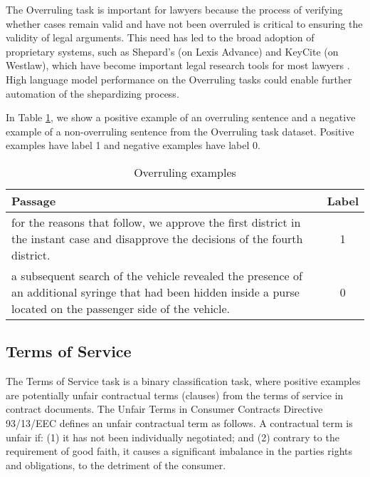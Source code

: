 \documentclass[sigconf]{acmart}
\begin{document}
The Overruling task is important for lawyers because the process of verifying whether cases remain valid and have not been overruled is critical to ensuring the validity of legal arguments. This need has led to the broad adoption of proprietary systems, such as Shepard's (on Lexis Advance) and KeyCite (on Westlaw), which have become important legal research tools for most lawyers \cite{doi:10.1080/02703190802365671}. High language model performance on the Overruling tasks could enable further automation of the shepardizing process.

In Table \ref{tab:overruling}, we show a positive example of an overruling sentence and a negative example of a non-overruling sentence from the Overruling task dataset. Positive examples have label 1 and negative examples have label 0.

\begin{table}[htb]
    \centering
    \small
    \caption{Overruling examples}
    \vspace{-0.15in}
    \begin{tabularx}{\columnwidth}{Xc}
         \toprule
         Passage & Label \\
         \midrule
         for the reasons that follow, we approve the first district in the instant case and disapprove the decisions of the fourth district. & 1 \\
         \midrule
         a subsequent search of the vehicle revealed the presence of an additional syringe that had been hidden inside a purse located on the passenger side of the vehicle. & 0 \\
         \bottomrule
    \end{tabularx}
    \label{tab:overruling}
    \vspace{-0.2in}
\end{table}

\subsection{Terms of Service}
\label{sec:tos}
The Terms of Service task is a binary classification task, where positive examples are potentially unfair contractual terms (clauses) from the terms of service in contract documents. The Unfair Terms in Consumer Contracts Directive 93/13/EEC \cite{directive93/13} defines an unfair contractual term as follows. A contractual term is unfair if: (1) it has not been individually negotiated; and (2) contrary to the requirement of good faith, it causes a significant imbalance in the parties rights and obligations, to the detriment of the consumer.
\end{document}
